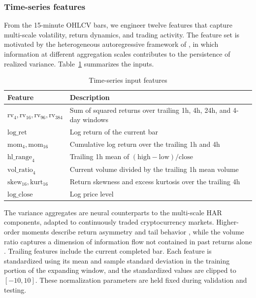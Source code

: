 \subsubsection{Time-series features}
From the 15-minute OHLCV bars, we engineer twelve features that capture
multi-scale volatility, return dynamics, and trading activity.
The feature set is motivated by the heterogeneous autoregressive
framework of \citet{Corsi_2008}, in which information at different
aggregation scales contributes to the persistence of realized variance.
Table~\ref{tab:ts_features} summarizes the inputs.

\begin{table}[htbp]
\centering\small
\caption{Time-series input features}\label{tab:ts_features}
\begin{tabular}{@{}lp{9.5cm}@{}}
\toprule
Feature & Description \\
\midrule
$\mathrm{rv}_4,\mathrm{rv}_{16},\mathrm{rv}_{96},\mathrm{rv}_{384}$ & Sum of squared returns over trailing 1h, 4h, 24h, and 4-day windows \\
$\mathrm{log\_ret}$ & Log return of the current bar \\
$\mathrm{mom}_4,\mathrm{mom}_{16}$ & Cumulative log return over the trailing 1h and 4h \\
$\mathrm{hl\_range}_4$ & Trailing 1h mean of $(\mathrm{high}-\mathrm{low})/\mathrm{close}$ \\
$\mathrm{vol\_ratio}_4$ & Current volume divided by the trailing 1h mean volume \\
$\mathrm{skew}_{16},\mathrm{kurt}_{16}$ & Return skewness and excess kurtosis over the trailing 4h \\
$\mathrm{log\_close}$ & Log price level \\
\bottomrule
\end{tabular}
\end{table}

The variance aggregates are neural counterparts to the multi-scale HAR
components, adapted to continuously traded cryptocurrency markets.
Higher-order moments describe return asymmetry and tail behavior
\citep{Patton_2015}, while the volume ratio captures a dimension of
information flow not contained in past returns alone
\citep{ANDERSEN_1996}. Trailing features include the current completed
bar. Each feature is standardized using its mean and sample standard
deviation in the training portion of the expanding window, and the
standardized values are clipped to $[-10,10]$. These normalization
parameters are held fixed during validation and testing.

